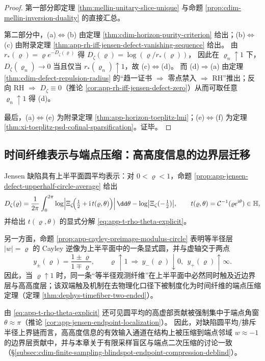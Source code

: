 \begin{proof}
第一部分即定理 \ref{thm:mellin-unitary-slice-unique} 与命题 \ref{prop:cdim-mellin-inversion-duality} 的直接汇总。
\par
第二部分中，(a)\(\Leftrightarrow\)(b) 由定理 \ref{thm:cdim-horizon-purity-criterion} 给出；(b)\(\Leftrightarrow\)(c) 由附录定理 \ref{thm:app-rh-iff-jensen-defect-vanishing-sequence} 给出。
由 \(r_{\ast}(\varrho)=\varrho e^{-D_{\zeta}(\varrho)}\) 得
\(
D_{\zeta}(\varrho)=\log(\varrho/r_{\ast}(\varrho))
\)，
因此在 \(\varrho_n\uparrow 1\) 下，\(D_{\zeta}(\varrho_n)\to 0\) 当且仅当 \(r_{\ast}(\varrho_n)\uparrow 1\)，故 (c)\(\Leftrightarrow\)(d)。
而 (d)\(\Rightarrow\)(a) 由定理 \ref{thm:cdim-defect-repulsion-radius} 的“趋一证书 \(\Rightarrow\) 零点禁入 \(\Rightarrow\) RH”推出；反向 RH \(\Rightarrow\) \(D_{\zeta}\equiv 0\)（推论 \ref{cor:app-rh-iff-jensen-defect-zero}）从而可取任意 \(\varrho_n\uparrow 1\) 得 (d)。
\par
最后，(a)\(\Leftrightarrow\)(e) 为附录定理 \ref{thm:app-horizon-toeplitz-lmi}；(e)\(\Leftrightarrow\)(f) 为定理 \ref{thm:xi-toeplitz-psd-cofinal-sparsification}。证毕。
\end{proof}

\subsection{时间纤维表示与端点压缩：高高度信息的边界层迁移}\label{subsec:cdim-timefiber-endpoint-compression}
Jensen 缺陷具有上半平面圆平均表示：对 \(0<\varrho<1\)，命题 \ref{prop:app-jensen-defect-upperhalf-circle-average} 给出
\[
D_{\zeta}(\varrho)
=\frac{1}{2\pi}\int_{0}^{2\pi}\log\Bigl|\Xi_{\zeta}\!\Bigl(\tfrac12+\mathrm{i}\,t(\varrho,\theta)\Bigr)\Bigr|\,\dd\theta
-\log\bigl|\Xi_{\zeta}(-\tfrac12)\bigr|,
\qquad
t(\varrho,\theta)=\mathcal{C}^{-1}(\varrho e^{\mathrm{i}\theta})\in\mathbb{H},
\]
并给出 \(t(\varrho,\theta)\) 的显式分解 \eqref{eq:app-t-rho-theta-explicit}。
\par
另一方面，命题 \ref{prop:app-cayley-preimage-modulus-circle} 表明等半径层 \(|w|=\varrho\) 的 Cayley 逆像为上半平面中的一条显式圆，并与虚轴交于两点
\[
y_{\pm}(\varrho)=\frac{1\pm\varrho}{1\mp\varrho},
\qquad
\varrho\uparrow 1\ \Longrightarrow\ y_{-}(\varrho)\downarrow 0,\ \ y_{+}(\varrho)\uparrow \infty.
\]
因此，当 \(\varrho\uparrow 1\) 时，同一条“等半径观测纤维”在上半平面中必然同时触及近边界层与高高度层；该双端触及机制在去物理化口径下被制度化为时间纤维的端点压缩定理（定理 \ref{thm:dephys-timefiber-two-ended}）。
\par
由 \eqref{eq:app-t-rho-theta-explicit} 还可见圆平均的高虚部贡献被强制集中于端点角窗 \(\theta\approx \pi\)（推论 \ref{cor:app-jensen-endpoint-localization}）。
因此，对缺陷圆平均/排斥半径上界链而言，高高度信息的有效输入通道在结构上被压缩到端点邻域 \(w\approx-1\) 的边界层贡献中，并与本章关于有限采样盲区与端点二次压缩的讨论一致（\S\ref{subsec:cdim-finite-sampling-blindspot-endpoint-compression-deblind}）。

